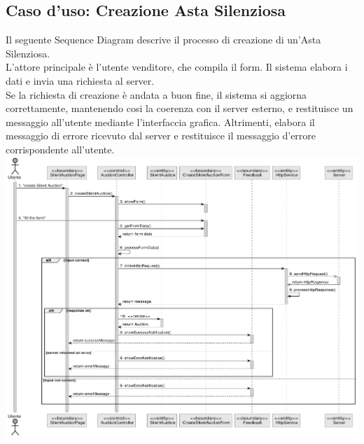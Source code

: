 \subsection{Caso d'uso: Creazione Asta Silenziosa}
Il seguente Sequence Diagram descrive il processo di creazione di un'Asta Silenziosa. \\
L'attore principale è l'utente venditore, che compila il form. Il sistema elabora i dati e invia una richiesta al server. \\
Se la richiesta di creazione è andata a buon fine, il sistema si aggiorna correttamente, mantenendo cosi la coerenza con il server esterno, e restituisce un messaggio all'utente mediante l'interfaccia grafica.
Altrimenti, elabora il messaggio di errore ricevuto dal server e restituisce il messaggio d'errore corrispondente all'utente. \bskip
\includegraphics[width=\textwidth]{assets/sequence/creazione_asta_silenziosa.pdf}

\pagebreak
